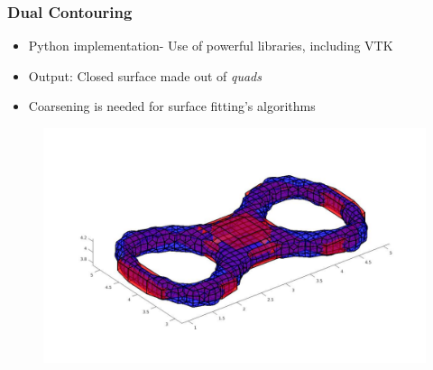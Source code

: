 \begin{frame}

	\frametitle{Dual Contouring}
	
	\begin{itemize}
	\item Python implementation- Use of powerful libraries, including VTK
	\item Output: Closed surface made out of \textit{quads}
	\item Coarsening is needed for surface fitting's algorithms
	\end{itemize}
	\begin{figure}
	\includegraphics[scale=0.2]{Pictures/DC/doubleTorus.pdf}
	\end{figure}
	
\end{frame}

